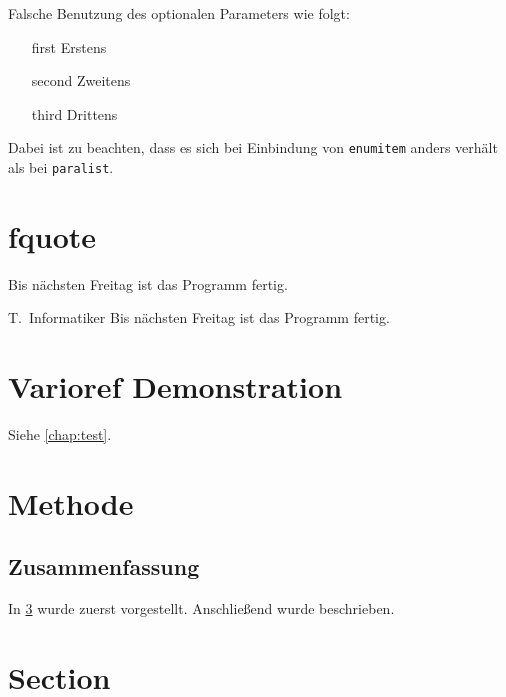 \documentclass[paper=a5,twoside,fontsize=10pt, DIV=calc, headings=small,bibliography=totoc, listof=totoc]{scrbook}
\begin{document}
Falsche Benutzung des optionalen Parameters wie folgt:
\begin{itemize}
\item[first] Erstens
\item[second] Zweitens
\item[third] Drittens
\end{itemize}
Dabei ist zu beachten, dass es sich bei Einbindung von \texttt{enumitem} anders verhält als bei \texttt{paralist}.


\section{fquote}

\begin{fquote}[T.\ Informatiker]
Bis nächsten Freitag ist das Programm fertig.
\end{fquote}

\begin{gfquote}{T.\ Informatiker}
Bis nächsten Freitag ist das Programm fertig.
\end{gfquote}


\section{Varioref Demonstration}
Siehe \vref{chap:test}.

\section{Methode}
\label{sec:method}

\label{sec:rqa}
\blindtext

\blindtext

\subsection{Zusammenfassung}
In \cref{sec:method} wurde zuerst  vorgestellt.
Anschließend wurde  beschrieben.

\section{Section}
\end{document}
